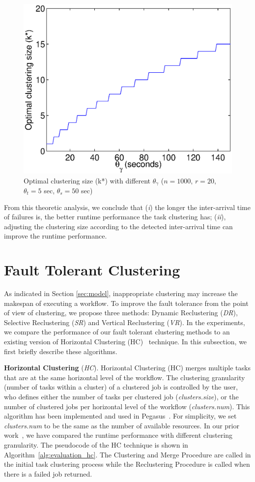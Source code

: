 \documentclass{IOS-Book-Article}
\begin{document}
\begin{figure}[!htb]
\centering
  \includegraphics[width=0.75\linewidth]{model_size.eps}
  \caption{Optimal clustering size (k*) with different  $\theta_{\gamma}$ ($n=1000$, $r=20$, $\theta_t=5$ sec, $\theta_s=50$ sec)}
  \label{fig:model_size}
\end{figure}


From this theoretic analysis, we conclude that (\emph{i}) the longer the inter-arrival time of failures is, the better runtime performance the task clustering has; (\emph{ii}), adjusting the clustering size according to the detected inter-arrival time can improve the runtime performance. 

\section{Fault Tolerant Clustering}
\label{sec:clustering}

As indicated in Section \ref{sec:model}, inappropriate clustering may increase the makespan of executing a workflow. To improve the fault tolerance from the point of view of clustering, we propose three methods: Dynamic Reclustering (\emph{DR}), Selective Reclustering (\emph{SR}) and Vertical Reclustering (\emph{VR}). In the experiments, we compare the performance of our fault tolerant clustering methods to an existing version of Horizontal Clustering (HC)~\cite{Singh2008} technique. In this subsection, we first briefly describe these algorithms.

\textbf{Horizontal Clustering} (\emph{HC}). 
Horizontal Clustering (HC) merges multiple tasks that are at the same horizontal level of the workflow. The clustering granularity (number of tasks within a cluster) of a clustered job is controlled by the user, who defines either the number of tasks per clustered job (\emph{clusters.size}), or the number of clustered jobs per horizontal level of the workflow (\emph{clusters.num}). This algorithm has been implemented and used in Pegasus~\cite{Singh2008}. For simplicity, we set \emph{clusters.num} to be the same as the number of available resources. In our prior work~\cite{Chen2013a,Chen2013b}, we have compared the runtime performance with different clustering granularity. The pseudocode of the HC technique is shown in Algorithm~\ref{alg:evaluation_hc}. The Clustering and Merge Procedure are called in the initial task clustering process while the Reclustering Procedure is called when there is a failed job returned. 
\end{document}
